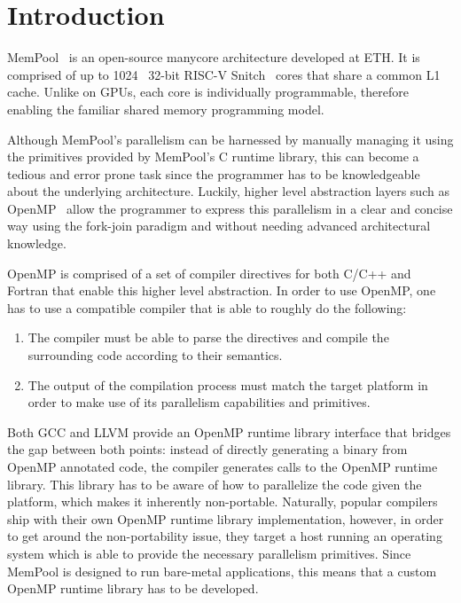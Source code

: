 \chapter{Introduction} \label{ch:introduction}

MemPool~\cite{mempool} is an open-source manycore architecture developed at ETH. It is comprised of
up to 1024~\cite{terapool} 32-bit RISC-V Snitch~\cite{snitch} cores that share a common L1 cache.
Unlike on GPUs, each core is individually programmable, therefore enabling the familiar shared
memory programming model.

Although MemPool's parallelism can be harnessed by manually managing it using the primitives
provided by MemPool's C runtime library, this can become a tedious and error prone task since the
programmer has to be knowledgeable about the underlying architecture. Luckily, higher level
abstraction layers such as OpenMP~\cite{openmp} allow the programmer to express this parallelism in
a clear and concise way using the fork-join paradigm and without needing advanced architectural
knowledge.

OpenMP is comprised of a set of compiler directives for both C/C++ and Fortran that enable this
higher level abstraction. In order to use OpenMP, one has to use a compatible compiler that is able
to roughly do the following:

\begin{enumerate}
	\item The compiler must be able to parse the directives and compile the surrounding code
	      according to their semantics.
	\item The output of the compilation process must match the target platform in order to make use
	      of its parallelism capabilities and primitives.
\end{enumerate}

Both GCC and LLVM provide an OpenMP runtime library interface that bridges the gap between both
points: instead of directly generating a binary from OpenMP annotated code, the compiler generates
calls to the OpenMP runtime library. This library has to be aware of how to parallelize the code
given the platform, which makes it inherently non-portable. Naturally, popular compilers ship with
their own OpenMP runtime library implementation, however, in order to get around the non-portability
issue, they target a host running an operating system which is able to provide the necessary
parallelism primitives. Since MemPool is designed to run bare-metal applications, this means that
a custom OpenMP runtime library has to be developed.

